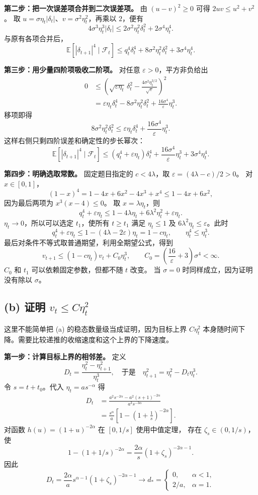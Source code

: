 \documentclass[UTF8,a4paper,11pt,fontset=fandol]{ctexart}
\newcommand{\E}{\mathbb E}
\begin{document}
\textbf{第二步：把一次误差项合并到二次误差项。}
由 $(u-v)^2\geq0$ 可得 $2uv\leq u^2+v^2$。
取 $u=\sigma\eta_t|\delta_t|$、$v=\sigma^2\eta_t^2$，再乘以 $2$，便有
\[
 4\sigma^3\eta_t^3|\delta_t|
 \leq2\sigma^2\eta_t^2\delta_t^2+2\sigma^4\eta_t^4.
\]
与原有各项合并后，
\[
 \E[|\delta_{t+1}|^4\mid\mathcal F_t]
 \leq q_t^4\delta_t^4+8\sigma^2\eta_t^2\delta_t^2+3\sigma^4\eta_t^4.
\]

\textbf{第三步：用少量四阶项吸收二阶项。}
对任意 $\varepsilon>0$，平方非负给出
\begin{align*}
 0&\leq\left(\sqrt{\varepsilon\eta_t}\,\delta_t^2
      -\frac{4\sigma^2\eta_t^{3/2}}{\sqrt\varepsilon}\right)^2\\
  &=\varepsilon\eta_t\delta_t^4-8\sigma^2\eta_t^2\delta_t^2
    +\frac{16\sigma^4}{\varepsilon}\eta_t^3.
\end{align*}
移项即得
\[
 8\sigma^2\eta_t^2\delta_t^2
 \leq\varepsilon\eta_t\delta_t^4
 +\frac{16\sigma^4}{\varepsilon}\eta_t^3.
\]
这样右侧只剩四阶误差和确定性的步长幂次：
\[
 \E[|\delta_{t+1}|^4\mid\mathcal F_t]
 \leq(q_t^4+\varepsilon\eta_t)\delta_t^4
 +\frac{16\sigma^4}{\varepsilon}\eta_t^3+3\sigma^4\eta_t^4.
\]

\textbf{第四步：明确选取常数。}
固定题目指定的 $c<4\lambda$，取 $\varepsilon=(4\lambda-c)/2>0$。
对 $x\in[0,1]$，
\[
 (1-x)^4=1-4x+6x^2-4x^3+x^4\leq1-4x+6x^2,
\]
因为最后两项为 $x^3(x-4)\leq0$。
取 $x=\lambda\eta_t$，则
\[
 q_t^4+\varepsilon\eta_t
 \leq1-4\lambda\eta_t+6\lambda^2\eta_t^2+\varepsilon\eta_t.
\]
$\eta_t\to0$，所以可以选定 $t_1$，使所有 $t\geq t_1$ 满足
$\eta_t\leq1$ 及 $6\lambda^2\eta_t\leq\varepsilon$。此时
\[
 q_t^4+\varepsilon\eta_t
 \leq1-(4\lambda-2\varepsilon)\eta_t=1-c\eta_t,
 \qquad\eta_t^4\leq\eta_t^3.
\]
最后对条件不等式取普通期望，利用全期望公式，得到
\[
 \boxed{v_{t+1}\leq(1-c\eta_t)v_t+C_0\eta_t^3},
 \qquad C_0=\left(\frac{16}{\varepsilon}+3\right)\sigma^4<\infty.
\]
$C_0$ 和 $t_1$ 可以依赖固定参数，但都不随 $t$ 改变。
当 $\sigma=0$ 时同样成立，因为证明没有除以 $\sigma$。

\subsection*{(b) 证明 $v_t\leq C\eta_t^2$}
这里不能简单把 (a) 的稳态数量级当成证明，因为目标上界
$C\eta_t^2$ 本身随时间下降。需要比较递推的收缩速度和这个上界的下降速度。

\textbf{第一步：计算目标上界的相邻差。}
定义
\[
 D_t=\frac{\eta_t^2-\eta_{t+1}^2}{\eta_t^3},
 \quad\text{于是}\quad\eta_{t+1}^2=\eta_t^2-D_t\eta_t^3.
\]
令 $s=t+t_0$。代入 $\eta_t=as^{-\alpha}$ 得
\begin{align*}
 D_t&=\frac{a^2s^{-2\alpha}-a^2(s+1)^{-2\alpha}}{a^3s^{-3\alpha}}\\
 &=\frac{s^\alpha}{a}\left[1-\left(1+\frac1s\right)^{-2\alpha}\right].
\end{align*}
对函数 $h(u)=(1+u)^{-2\alpha}$ 在 $[0,1/s]$ 使用中值定理，
存在 $\zeta_s\in(0,1/s)$，使
\[
 1-(1+1/s)^{-2\alpha}
 =\frac{2\alpha}{s}(1+\zeta_s)^{-2\alpha-1}.
\]
因此
\[
 D_t=\frac{2\alpha}{a}s^{\alpha-1}(1+\zeta_s)^{-2\alpha-1}
 \longrightarrow d_*=
 \begin{cases}0,&\alpha<1,\\2/a,&\alpha=1.\end{cases}
\]
\end{document}
